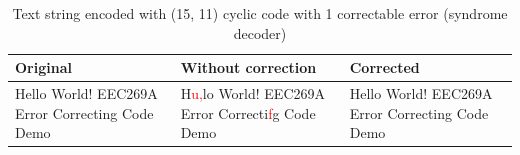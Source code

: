 \documentclass{article}
\begin{document}
\begin{table}[htb]
    \centering
    \caption{Text string encoded with (15, 11) cyclic code with 1 correctable error (syndrome decoder)}
    \label{tab:text-cyclic-15-11-syndrome}
    \renewcommand{\arraystretch}{1.5}
    \begin{tabulary}{\textwidth}{ |L|L|L| } 
    \hline
    \textbf{Original} & \textbf{Without correction} & \textbf{Corrected} \\
    \hline
    Hello World! EEC269A Error Correcting Code Demo & H\textcolor{red}{u,}lo World! EEC269A Error Correcti\textcolor{red}{f}g Code Demo & Hello World! EEC269A Error Correcting Code Demo \\
    \hline
    \end{tabulary}
\end{table}
\end{document}
